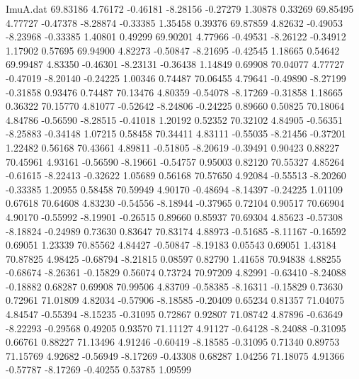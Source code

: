 \begin{filecontents}{ImuA.dat}
  69.83186    4.76172   -0.46181   -8.28156   -0.27279    1.30878    0.33269
  69.85495    4.77727   -0.47378   -8.28874   -0.33385    1.35458    0.39376
  69.87859    4.82632   -0.49053   -8.23968   -0.33385    1.40801    0.49299
  69.90201    4.77966   -0.49531   -8.26122   -0.34912    1.17902    0.57695
  69.94900    4.82273   -0.50847   -8.21695   -0.42545    1.18665    0.54642
  69.99487    4.83350   -0.46301   -8.23131   -0.36438    1.14849    0.69908
  70.04077    4.77727   -0.47019   -8.20140   -0.24225    1.00346    0.74487
  70.06455    4.79641   -0.49890   -8.27199   -0.31858    0.93476    0.74487
  70.13476    4.80359   -0.54078   -8.17269   -0.31858    1.18665    0.36322
  70.15770    4.81077   -0.52642   -8.24806   -0.24225    0.89660    0.50825
  70.18064    4.84786   -0.56590   -8.28515   -0.41018    1.20192    0.52352
  70.32102    4.84905   -0.56351   -8.25883   -0.34148    1.07215    0.58458
  70.34411    4.83111   -0.55035   -8.21456   -0.37201    1.22482    0.56168
  70.43661    4.89811   -0.51805   -8.20619   -0.39491    0.90423    0.88227
  70.45961    4.93161   -0.56590   -8.19661   -0.54757    0.95003    0.82120
  70.55327    4.85264   -0.61615   -8.22413   -0.32622    1.05689    0.56168
  70.57650    4.92084   -0.55513   -8.20260   -0.33385    1.20955    0.58458
  70.59949    4.90170   -0.48694   -8.14397   -0.24225    1.01109    0.67618
  70.64608    4.83230   -0.54556   -8.18944   -0.37965    0.72104    0.90517
  70.66904    4.90170   -0.55992   -8.19901   -0.26515    0.89660    0.85937
  70.69304    4.85623   -0.57308   -8.18824   -0.24989    0.73630    0.83647
  70.83174    4.88973   -0.51685   -8.11167   -0.16592    0.69051    1.23339
  70.85562    4.84427   -0.50847   -8.19183    0.05543    0.69051    1.43184
  70.87825    4.98425   -0.68794   -8.21815    0.08597    0.82790    1.41658
  70.94838    4.88255   -0.68674   -8.26361   -0.15829    0.56074    0.73724
  70.97209    4.82991   -0.63410   -8.24088   -0.18882    0.68287    0.69908
  70.99506    4.83709   -0.58385   -8.16311   -0.15829    0.73630    0.72961
  71.01809    4.82034   -0.57906   -8.18585   -0.20409    0.65234    0.81357
  71.04075    4.84547   -0.55394   -8.15235   -0.31095    0.72867    0.92807
  71.08742    4.87896   -0.63649   -8.22293   -0.29568    0.49205    0.93570
  71.11127    4.91127   -0.64128   -8.24088   -0.31095    0.66761    0.88227
  71.13496    4.91246   -0.60419   -8.18585   -0.31095    0.71340    0.89753
  71.15769    4.92682   -0.56949   -8.17269   -0.43308    0.68287    1.04256
  71.18075    4.91366   -0.57787   -8.17269   -0.40255    0.53785    1.09599

\end{filecontents}
